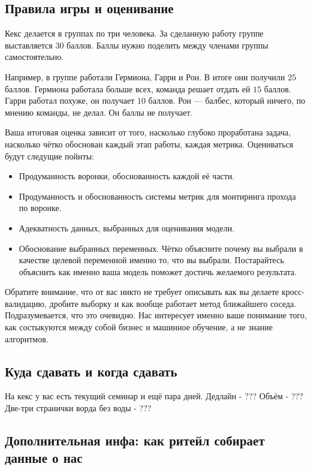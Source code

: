 \documentclass[12pt, a4paper, oneside]{article}
\begin{document}
\subsection*{Правила игры и оценивание} 

Кекс делается в группах по три человека. За сделанную работу группе выставляется $30$ баллов. Баллы нужно поделить между членами группы самостоятельно. 

Например, в группе работали Гермиона, Гарри и Рон. В итоге они получили $25$ баллов. Гермиона работала больше всех, команда решает отдать ей $15$ баллов. Гарри работал похуже, он получает $10$ баллов. Рон --- балбес, который ничего, по мнению команды, не делал. Он баллы не получает. 

Ваша итоговая оценка зависит от того, насколько глубоко проработана задача, насколько чётко обоснован каждый этап работы, каждая метрика.  Оцениваться будут следущие пойнты: 

\begin{itemize}
	\item Продуманность воронки, обоснованность каждой её части. 
	\item Продуманность и обоснованность системы метрик для монтиринга прохода по воронке. 	
	\item Адекватность данных, выбранных для оценивания модели.
	\item Обоснование выбранных переменных. Чётко объясните почему вы выбрали в качестве целевой переменной именно то, что вы выбрали. Постарайтесь объяснить как именно ваша модель поможет достичь желаемого результата. 
\end{itemize}

Обратите внимание, что от вас никто не требует описывать как вы делаете кросс-валидацию, дробите выборку и как вообще работает метод ближайшего соседа. Подразумевается, что это очевидно. Нас интересует именно ваше понимание того, как состыкуются между собой бизнес и машинное обучение, а не знание алгоритмов. 

\subsection*{Куда сдавать и когда сдавать}

На кекс у вас есть текущий семинар и ещё пара дней. Дедлайн - ???  Объём - ??? Две-три странички ворда без воды - ??? 


\subsection*{Дополнительная инфа: как ритейл собирает данные о нас}  
\end{document}
